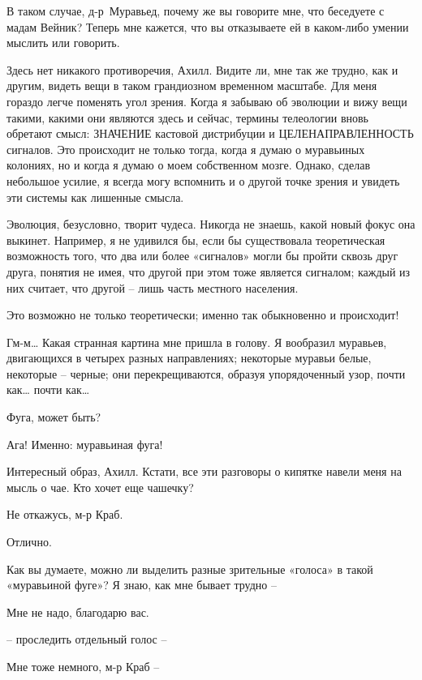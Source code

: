 \documentclass[../main.tex]{subfiles}
\begin{document}
\begin{dialogue}
 В таком случае, д-р~Муравьед, почему же вы говорите мне, что беседуете с мадам Вейник? Теперь мне кажется, что вы отказываете ей в каком-либо умении мыслить или говорить.

 Здесь нет никакого противоречия, Ахилл. Видите ли, мне так же трудно, как и другим, видеть вещи в таком грандиозном временном масштабе. Для меня гораздо легче поменять угол зрения. Когда я забываю об эволюции и вижу вещи такими, какими они являются здесь и сейчас, термины телеологии вновь обретают смысл: ЗНАЧЕНИЕ кастовой дистрибуции и ЦЕЛЕНАПРАВЛЕННОСТЬ сигналов. Это происходит не только тогда, когда я думаю о муравьиных колониях, но и когда я думаю о моем собственном мозге. Однако, сделав небольшое усилие, я всегда могу вспомнить и о другой точке зрения и увидеть эти системы как лишенные смысла.

 Эволюция, безусловно, творит чудеса. Никогда не знаешь, какой новый фокус она выкинет. Например, я не удивился бы, если бы существовала теоретическая возможность того, что два или более «сигналов» могли бы пройти сквозь друг друга, понятия не имея, что другой при этом тоже является сигналом; каждый из них считает, что другой \--- лишь часть местного населения.

 Это возможно не только теоретически; именно так обыкновенно и происходит!

 Гм-м\ldots{} Какая странная картина мне пришла в голову. Я вообразил муравьев, двигающихся в четырех разных направлениях; некоторые муравьи белые, некоторые \--- черные; они перекрещиваются, образуя упорядоченный узор, почти как\ldots{} почти как\ldots{}

 Фуга, может быть?

 Ага! Именно: муравьиная фуга!

 Интересный образ, Ахилл. Кстати, все эти разговоры о кипятке навели меня на мысль о чае. Кто хочет еще чашечку?

 Не откажусь, м-р Краб.

 Отлично.

 Как вы думаете, можно ли выделить разные зрительные «голоса» в такой «муравьиной фуге»? Я знаю, как мне бывает трудно \---

 Мне не надо, благодарю вас.

 \--- проследить отдельный голос \---

 Мне тоже немного, м-р Краб \---


\end{dialogue}
\end{document}
